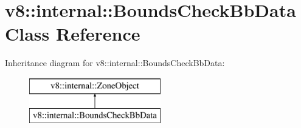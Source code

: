 \hypertarget{classv8_1_1internal_1_1_bounds_check_bb_data}{}\section{v8\+:\+:internal\+:\+:Bounds\+Check\+Bb\+Data Class Reference}
\label{classv8_1_1internal_1_1_bounds_check_bb_data}
Inheritance diagram for v8\+:\+:internal\+:\+:Bounds\+Check\+Bb\+Data\+:\begin{figure}[H]
\begin{center}
\leavevmode
\includegraphics[height=2.000000cm]{classv8_1_1internal_1_1_bounds_check_bb_data}
\end{center}
\end{figure}
